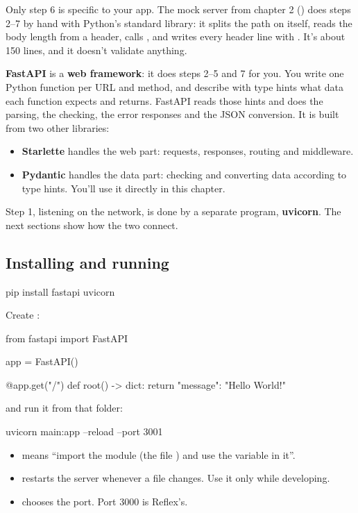 Only step 6 is specific to your app. The mock server from chapter 2 () does steps 2--7 by hand with Python's standard library: it splits the path on \cd{/} itself, reads the body length from a header, calls , and writes every header line with . It's about 150 lines, and it doesn't validate anything.

\textbf{FastAPI} is a \textbf{web framework}: it does steps 2--5 and 7 for you. You write one Python function per URL and method, and describe with type hints what data each function expects and returns. FastAPI reads those hints and does the parsing, the checking, the error responses and the JSON conversion. It is built from two other libraries:
\begin{itemize}
\item \textbf{Starlette} handles the web part: requests, responses, routing and middleware.
\item \textbf{Pydantic} handles the data part: checking and converting data according to type hints. You'll use it directly in this chapter.
\end{itemize}

Step 1, listening on the network, is done by a separate program, \textbf{uvicorn}. The next sections show how the two connect.

\subsection{Installing and running}

\begin{code}
pip install fastapi uvicorn
\end{code}

Create :

\begin{py}
from fastapi import FastAPI

app = FastAPI()


@app.get("/")
def root() -> dict:
	return {"message": "Hello World!"}
\end{py}

and run it from that folder:

\begin{code}
uvicorn main:app --reload --port 3001
\end{code}

\begin{itemize}
\item {} means ``import the module  (the file ) and use the variable  in it''.
\item {} restarts the server whenever a  file changes. Use it only while developing.
\item {} chooses the port. Port 3000 is Reflex's.
\end{itemize}

